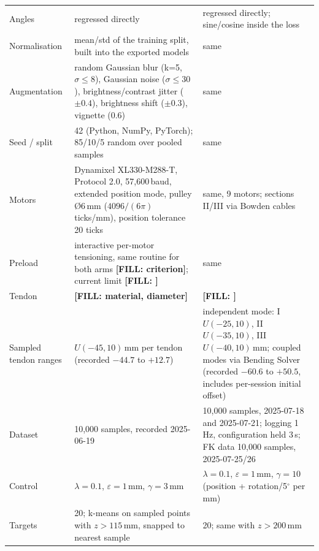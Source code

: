 \documentclass[10pt,a4paper]{article}
\newcommand{\FILL}[1]{\textcolor{orange!85!black}{\textbf{[FILL: #1]}}}
\begin{document}
\begin{longtable}{p{3.2cm}p{6.6cm}p{6.6cm}}
Angles & regressed directly & regressed directly; sine/cosine inside the loss\\
Normalisation & mean/std of the training split, built into the exported models & same\\
Augmentation & random Gaussian blur (k=5, $\sigma\le8$), Gaussian noise ($\sigma\le30$), brightness/contrast jitter ($\pm0.4$), brightness shift ($\pm0.3$), vignette (0.6) & same\\
Seed / split & 42 (Python, NumPy, PyTorch); 85/10/5 random over pooled samples & same\\
Motors & Dynamixel XL330-M288-T, Protocol 2.0, 57,600\,baud, extended position mode, pulley \O6\,mm ($4096/(6\pi)$ ticks/mm), position tolerance 20 ticks & same, 9 motors; sections II/III via Bowden cables\\
Preload & interactive per-motor tensioning, same routine for both arms \FILL{criterion}; current limit \FILL{} & same\\
Tendon & \FILL{material, diameter} & \FILL{}\\
Sampled tendon ranges & $U(-45,10)$\,mm per tendon (recorded $-44.7$ to $+12.7$) & independent mode: I $U(-25,10)$, II $U(-35,10)$, III $U(-40,10)$\,mm; coupled modes via Bending Solver (recorded $-60.6$ to $+50.5$, includes per-session initial offset)\\
Dataset & 10,000 samples, recorded 2025-06-19 & 10,000 samples, 2025-07-18 and 2025-07-21; logging 1\,Hz, configuration held 3\,s; FK data 10,000 samples, 2025-07-25/26\\
Control & $\lambda=0.1$, $\varepsilon=1$\,mm, $\gamma=3$\,mm & $\lambda=0.1$, $\varepsilon=1$\,mm, $\gamma=10$ (position + rotation/5$^\circ$ per mm)\\
Targets & 20; k-means on sampled points with $z>115$\,mm, snapped to nearest sample & 20; same with $z>200$\,mm\\
\bottomrule
\end{longtable}
\normalsize
\end{document}

